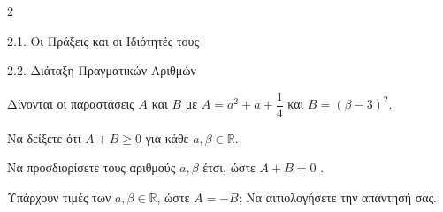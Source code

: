 \begin{ylh}{2}
    \item 2.1. Οι Πράξεις και οι Ιδιότητές τους
    \item 2.2. Διάταξη Πραγματικών Αριθμών
\end{ylh}
Δίνονται οι παραστάσεις $A$ και $B$ με $A = a^2 + a + \dfrac{1}{4}$ και $B = (\beta - 3)^2$.
\begin{alist}
\item
\begin{rlist}
\item Να δείξετε ότι $A + B \ge 0$ για κάθε $a, \beta \in \mathbb{R}$. 
\item Να προσδιορίσετε τους αριθμούς $a, \beta$ έτσι, ώστε $A + B = 0$ . 
\end{rlist}
\item Υπάρχουν τιμές των $a, \beta \in \mathbb{R}$, ώστε $A = -B$; Να αιτιολογήσετε την απάντησή σας. 
\end{alist}

